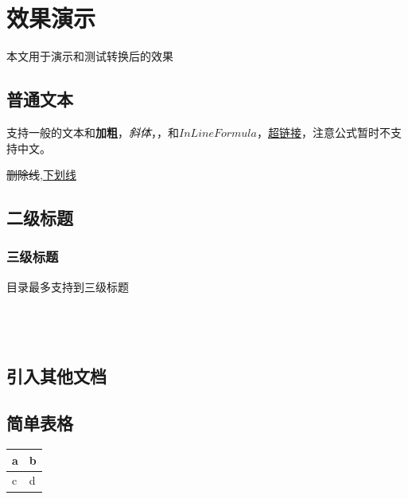 \documentclass[UTF8]{ctexart}
\newenvironment{marktext}{}{}
\newlength\tablewidth
\begin{document}
\begin{marktext}


\section{效果演示}




本文用于演示和测试转换后的效果


\subsection{普通文本}


支持一般的文本和\textbf{加粗}，\textit{斜体}，，和$InLine Formula$，\href{http://github.com}{超链接}，注意公式暂时不支持中文。


\sout{删除线},\underline{下划线}


\subsection{二级标题}




\subsubsection{三级标题}


目录最多支持到三级标题
\\\\
\\\\






\subsection{引入其他文档}




\normalsize
\begin{marktext}


\subsection{简单表格}


\end{marktext}
\begin{center}
\setlength\tablewidth{\dimexpr (\textwidth -4\tabcolsep)}
\begin{tabular}{|p{0.500\tablewidth}<{\centering}|p{0.500\tablewidth}<{\centering}|}
\hline
\rowcolor{tabletopgray}
\textbf{a}&\textbf{b}\\
\hline
c&d\\
\hline
\end{tabular}
\end{center}
\begin{marktext}



\end{marktext}
\end{marktext}
\end{document}
